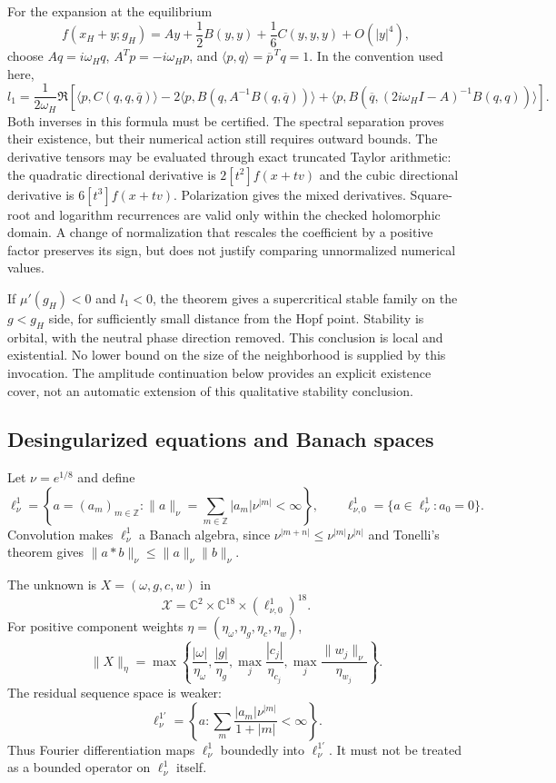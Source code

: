 \documentclass[11pt]{article}
\theoremstyle{definition}
\begin{document}
For the expansion at the equilibrium
\[
 f(x_H+y;g_H)=Ay+\frac12 B(y,y)+\frac16 C(y,y,y)+O(|y|^4),
\]
choose $Aq=i\omega_Hq$, $A^Tp=-i\omega_Hp$, and
$\langle p,q\rangle=\overline p^{\,T}q=1$. In the convention used here,
\[
 l_1=\frac{1}{2\omega_H}\Re\left[
 \langle p,C(q,q,\overline q)\rangle
 -2\langle p,B(q,A^{-1}B(q,\overline q))\rangle
 +\langle p,B(\overline q,(2i\omega_HI-A)^{-1}B(q,q))\rangle
 \right].
\]
Both inverses in this formula must be certified. The spectral separation proves their existence, but their numerical action still requires outward bounds. The derivative tensors may be evaluated through exact truncated Taylor arithmetic: the quadratic directional derivative is $2[t^2]f(x+tv)$ and the cubic directional derivative is $6[t^3]f(x+tv)$. Polarization gives the mixed derivatives. Square-root and logarithm recurrences are valid only within the checked holomorphic domain. A change of normalization that rescales the coefficient by a positive factor preserves its sign, but does not justify comparing unnormalized numerical values.

If $\mu'(g_H)<0$ and $l_1<0$, the theorem gives a supercritical stable family on the $g<g_H$ side, for sufficiently small distance from the Hopf point. Stability is orbital, with the neutral phase direction removed. This conclusion is local and existential. No lower bound on the size of the neighborhood is supplied by this invocation. The amplitude continuation below provides an explicit existence cover, not an automatic extension of this qualitative stability conclusion.

\subsection{Desingularized equations and Banach spaces}\label{sec:ha-5}

Let $\nu=e^{1/8}$ and define
\[
 \ell^1_\nu=\left\{a=(a_m)_{m\in\mathbb Z}:
       \|a\|_\nu=\sum_{m\in\mathbb Z}|a_m|\nu^{|m|}<\infty\right\},
 \qquad
 \ell^1_{\nu,0}=\{a\in\ell^1_\nu:a_0=0\}.
\]
Convolution makes $\ell^1_\nu$ a Banach algebra, since
$\nu^{|m+n|}\le\nu^{|m|}\nu^{|n|}$ and Tonelli's theorem gives
$\|a*b\|_\nu\le\|a\|_\nu\|b\|_\nu$.

The unknown is $X=(\omega,g,c,w)$ in
\[
 \mathcal X=\mathbb C^2\times\mathbb C^{18}
                    \times(\ell^1_{\nu,0})^{18}.
\]
For positive component weights $\eta=(\eta_\omega,\eta_g,\eta_c,\eta_w)$,
\[
 \|X\|_\eta=
 \max\left\{\frac{|\omega|}{\eta_\omega},
 \frac{|g|}{\eta_g},
 \max_j\frac{|c_j|}{\eta_{c_j}},
 \max_j\frac{\|w_j\|_\nu}{\eta_{w_j}}\right\}.
\]
The residual sequence space is weaker:
\[
 \ell^{1\prime}_\nu=
 \left\{a:\sum_m\frac{|a_m|\nu^{|m|}}{1+|m|}<\infty\right\}.
\]
Thus Fourier differentiation maps $\ell^1_\nu$ boundedly into
$\ell^{1\prime}_\nu$. It must not be treated as a bounded operator on
$\ell^1_\nu$ itself.
\end{document}
